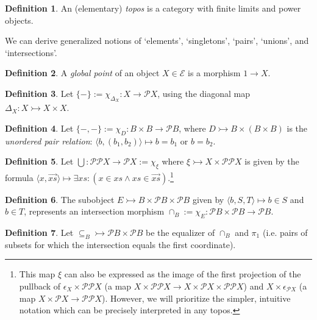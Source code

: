 \documentclass{article}
\theoremstyle{definition}
\newtheorem{definition}{Definition}[section]
\newcommand{\cE}{\mathcal{E}}
\newcommand{\cP}{\mathcal{P}}
\begin{document}
\begin{definition}
    An (elementary) {\it topos} is a category with finite limits and power objects.
\end{definition}


We can derive generalized notions of `elements', `singletons', `pairs', `unions', and `intersections'.

\begin{definition}
    \label{def:gpoint}
    A {\it global point} of an object $X \in \cE$ is a morphism $1\to X$.
\end{definition}

\begin{definition}
    \label{def:sing}
    Let $\{-\} := \chi_{\Delta_X}\colon X \to \cP X$, using the diagonal map $\Delta_X\colon X\rightarrowtail X\times X$.  
    
\end{definition}

\begin{definition}
    Let $\{-,-\}:=\chi_D\colon B\times B\to\cP B$, where
    $D\rightarrowtail B\times (B\times B)$ is the {\it unordered pair relation}: $\langle b,(b_1,b_2)\rangle\mapsto b=b_1$ or $b=b_2$.
\end{definition}

\begin{definition}
    
\label{def:union}
Let $\bigcup \colon \cP \cP X \to \cP X := \chi_{\xi}$ where $\xi\rightarrowtail X \times \cP \cP X$ is given by the formula $\langle x, \vec{xs}\rangle\mapsto \exists xs\colon (x \in xs \wedge xs \in \vec{xs})$.\footnote{This map $\xi$ can also be expressed as the image of the first projection of the pullback of $\epsilon_X \times \cP\cP X$ (a map $X \times \cP\cP X \to X \times \cP X \times \cP \cP X$) and $X \times \epsilon_{\cP X}$ (a map $X \times \cP X \to \cP \cP X$). However, we will prioritize the simpler, intuitive notation which can be precisely interpreted in any topos.}
\end{definition}

\begin{definition}
    \label{def:intersection}
    The subobject $E \rightarrowtail B \times \cP B \times \cP B$ given by $\langle b, S, T\rangle \mapsto b \in S$ and $b \in T$, represents an intersection morphism $\cap_B:=\chi_E \colon \cP B \times \cP B \to \cP B$. 
\end{definition}

\begin{definition}
    \label{def:subset}
    Let $\subseteq_B\rightarrowtail\cP B\times\cP B$ be the
    equalizer of $\cap_B$ and $\pi_1$ (i.e. pairs of subsets for which the intersection equals the first coordinate).
\end{definition}
\end{document}
